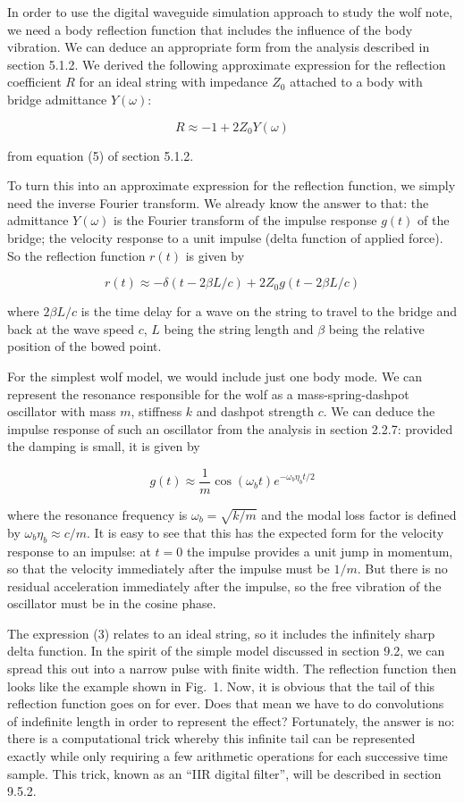   In order to use the digital waveguide simulation approach to study the wolf 
  note, we need a body reflection function that includes the influence of the 
  body vibration. We can deduce an appropriate form from the analysis described 
  in section 5.1.2. We derived the following approximate expression for the 
  reflection coefficient $R$ for an ideal string with impedance $Z_0$ attached 
  to a body with bridge admittance $Y(\omega)$: 

  $$R \approx -1 + 2 Z_0 Y(\omega) \tag{1}$$ 

  from equation (5) of section 5.1.2. 

  To turn this into an approximate expression for the reflection function, we 
  simply need the inverse Fourier transform. We already know the answer to 
  that: the admittance $Y(\omega)$ is the Fourier transform of the impulse 
  response $g(t)$ of the bridge; the velocity response to a unit impulse (delta 
  function of applied force). So the reflection function $r(t)$ is given by 

  $$r(t) \approx -\delta(t-2\beta L /c) + 2Z_0 g(t-2\beta L /c) \tag{2}$$ 

  where $2\beta L/c$ is the time delay for a wave on the string to travel to 
  the bridge and back at the wave speed $c$, $L$ being the string length and 
  $\beta$ being the relative position of the bowed point. 

  For the simplest wolf model, we would include just one body mode. We can 
  represent the resonance responsible for the wolf as a mass-spring-dashpot 
  oscillator with mass $m$, stiffness $k$ and dashpot strength $c$. We can 
  deduce the impulse response of such an oscillator from the analysis in 
  section 2.2.7: provided the damping is small, it is given by 

  $$g(t) \approx \dfrac{1}{m} \cos (\omega_b t) e^{-\omega_b \eta_b t/2} 
  \tag{3}$$ 

  where the resonance frequency is $\omega_b = \sqrt{k/m}$ and the modal loss 
  factor is defined by $\omega_b \eta_b \approx c/m$. It is easy to see that 
  this has the expected form for the velocity response to an impulse: at $t=0$ 
  the impulse provides a unit jump in momentum, so that the velocity 
  immediately after the impulse must be $1/m$. But there is no residual 
  acceleration immediately after the impulse, so the free vibration of the 
  oscillator must be in the cosine phase. 

  The expression (3) relates to an ideal string, so it includes the infinitely 
  sharp delta function. In the spirit of the simple model discussed in section 
  9.2, we can spread this out into a narrow pulse with finite width. The 
  reflection function then looks like the example shown in Fig.\ 1. Now, it is 
  obvious that the tail of this reflection function goes on for ever. Does that 
  mean we have to do convolutions of indefinite length in order to represent 
  the effect? Fortunately, the answer is no: there is a computational trick 
  whereby this infinite tail can be represented exactly while only requiring a 
  few arithmetic operations for each successive time sample. This trick, known 
  as an ``IIR digital filter'', will be described in section 9.5.2. 